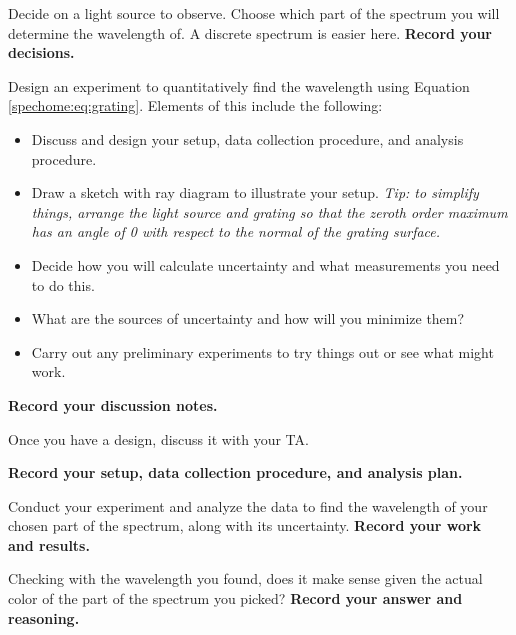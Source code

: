 \begin{steps}
	\item Decide on a light source to observe. Choose which part of the spectrum you will determine the wavelength of. A discrete spectrum is easier here. \textbf{Record your decisions.}
	
	\item Design an experiment to quantitatively find the wavelength using Equation \ref{spechome:eq:grating}. Elements of this include the following:
	
	\begin{itemize}
		\item Discuss and design your setup, data collection procedure, and analysis procedure.
		
		\item Draw a sketch with ray diagram to illustrate your setup. \textit{Tip: to simplify things, arrange the light source and grating so that the zeroth order maximum has an angle of 0\textdegree{} with respect to the normal of the grating surface.}
		
		\item Decide how you will calculate uncertainty and what measurements you need to do this.
		
		\item What are the sources of uncertainty and how will you minimize them?
		
		\item Carry out any preliminary experiments to try things out or see what might work.
	\end{itemize}
	
	\textbf{Record your discussion notes.}
	
	\item Once you have a design, discuss it with your TA.
	
	\item \textbf{Record your setup, data collection procedure, and analysis plan.}
	
	\item Conduct your experiment and analyze the data to find the wavelength of your chosen part of the spectrum, along with its uncertainty. \textbf{Record your work and results.}
	
	\item Checking with the wavelength you found, does it make sense given the actual color of the part of the spectrum you picked? \textbf{Record your answer and reasoning.}
\end{steps}

